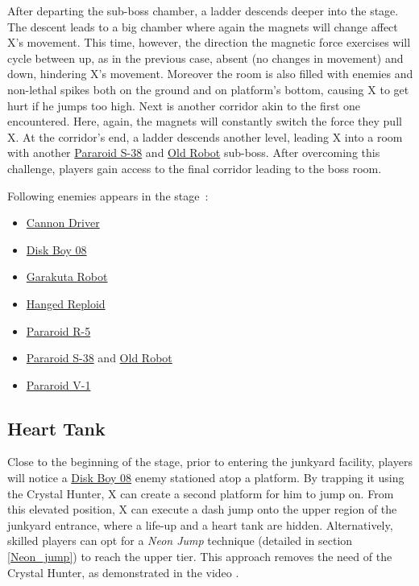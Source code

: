 After departing the sub-boss chamber, a ladder descends deeper into the stage. The descent leads to a big chamber where again the magnets will change affect X's movement. This time, however, the direction the magnetic force exercises will cycle between up, as in the previous case, absent (no changes in movement) and down, hindering X's movement. Moreover the room is also filled with enemies and non-lethal spikes both on the ground and on platform's bottom, causing X to get hurt if he jumps too high. Next is another corridor akin to the first one encountered. Here, again, the magnets will constantly switch the force they pull X. At the corridor's end, a ladder descends another level, leading X into a room with another \hyperlink{miniboss:Pararoid_S-38}{Pararoid S-38} and \hyperlink{miniboss:Old_robot}{Old Robot} sub-boss. After overcoming this challenge, players gain access to the final corridor leading to the boss room.

Following enemies appears in the stage~\cite{wiki:Robot_Junkyard}:
\begin{itemize}
	
	\item \hyperlink {enem:Cannon_Driver}{Cannon Driver}
	\item \hyperlink {enem:Disk_Boy_08}{Disk Boy 08}
	\item \hyperlink {enem:Garakuta_Robot}{Garakuta Robot} 
	\item \hyperlink {enem:Hanged_Reploid}{Hanged Reploid}
	\item \hyperlink {enem:Pararoid_R-5}{Pararoid R-5}
	\item \hyperlink {miniboss:Pararoid_S-38}{Pararoid S-38} and \hyperlink{miniboss:Old_robot}{Old Robot}
	\item \hyperlink {enem:Pararoid_V-1}{Pararoid V-1}
\end{itemize}


\subsection{Heart Tank}
Close to the beginning of the stage, prior to entering the junkyard facility, players will notice a \hyperlink {enem:Disk_Boy_08}{Disk Boy 08}  enemy stationed atop a platform. By trapping it using the Crystal Hunter, X can create a second platform for him to jump on. From this elevated position, X can execute a dash jump onto the upper region of the junkyard entrance, where a life-up and a heart tank are hidden. Alternatively, skilled players can opt for a \emph{Neon Jump} technique (detailed in section \ref{Neon_jump}) to reach the upper tier. This approach removes the need of the Crystal Hunter, as demonstrated in the video .

